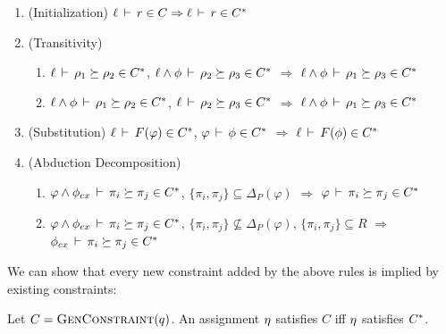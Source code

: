\documentclass[a4paper,UKenglish]{lipics-v2018}
\newcommand{\conj}{\wedge}
\newcommand{\isvalid}[2]{#1\,\vdash\,#2}
\newcommand{\outlives}{\succeq}
\newcommand{\regionConstants}{R}
\newcommand{\predDeltaMap}{{\Delta_P}}
\newcommand{\phictxt}{\phi_{cx}}
\begin{document}
\begin{enumerate}

\item (Initialization) $\isvalid{\ell}{r} \in C \Rightarrow \isvalid{\ell}{r} \in \saturate{C}$

\item (Transitivity)
  \label{item:transitivity}
\begin{enumerate}
\item
$\isvalid{\ell}{\rho_1 \outlives \rho_2} \in \saturate{C}$,
$\isvalid{\ell \conj \phi}{\rho_2 \outlives \rho_3} \in \saturate{C}$
$\Rightarrow$
$\isvalid{\ell \conj \phi}{\rho_1 \outlives \rho_3} \in \saturate{C}$
\item
$\isvalid{\ell \conj \phi}{\rho_1 \outlives \rho_2} \in \saturate{C}$,
$\isvalid{\ell}{\rho_2 \outlives \rho_3} \in \saturate{C}$
$\Rightarrow$
$\isvalid{\ell \conj \phi}{\rho_1 \outlives \rho_3} \in \saturate{C}$
\end{enumerate}

\item (Substitution)
  \label{item:subst}
$\isvalid{\ell}{F(\varphi)} \in \saturate{C}$,
$\isvalid{\varphi}{\phi} \in \saturate{C}$
$\Rightarrow$ $\isvalid{\ell}{F(\phi)} \in \saturate{C}$

\item (Abduction Decomposition)
\label{item:context}
\begin{enumerate}
\item
$\isvalid{\varphi \conj \phictxt}{\pi_i \outlives \pi_j} \in \saturate{C}$,
$\{ \pi_i, \pi_j \} \subseteq \predDeltaMap(\varphi)$
$\Rightarrow$
$\isvalid{\varphi}{\pi_i \outlives \pi_j} \in \saturate{C} $

\item 
$\isvalid{\varphi \conj \phictxt}{\pi_i \outlives \pi_j} \in \saturate{C}$,
$\{ \pi_i, \pi_j \} \not\subseteq \predDeltaMap(\varphi)$,
$\{ \pi_i, \pi_j \} \subseteq \regionConstants$
$\Rightarrow$
$\isvalid{\phictxt}{\pi_i \outlives \pi_j} \in \saturate{C} $
\end{enumerate}

\end{enumerate}

We can show that every new constraint added by the above rules is
implied by existing constraints:

\begin{theorem}
  \label{thm:closure}
Let $C = \textsc{GenConstraint}(q)$.
An assignment $\eta$ satisfies $C$ iff $\eta$ satisfies ${C}^*$.
\end{theorem}
\end{document}
